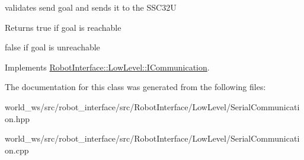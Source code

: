 validates send goal and sends it to the S\+S\+C32U 

\begin{DoxyReturn}{Returns}
true if goal is reachable 

false if goal is unreachable 
\end{DoxyReturn}


Implements \hyperlink{classRobotInterface_1_1LowLevel_1_1ICommunication_a88fc73dd43eb0444895e1a8b33fc1623}{Robot\+Interface\+::\+Low\+Level\+::\+I\+Communication}.



The documentation for this class was generated from the following files\+:\begin{DoxyCompactItemize}
\item 
world\+\_\+ws/src/robot\+\_\+interface/src/\+Robot\+Interface/\+Low\+Level/Serial\+Communication.\+hpp\item 
world\+\_\+ws/src/robot\+\_\+interface/src/\+Robot\+Interface/\+Low\+Level/Serial\+Communication.\+cpp\end{DoxyCompactItemize}
